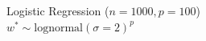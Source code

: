 \documentclass[aspectratio=169,17pt,t]{beamer}
\begin{document}




\begin{frame}
  \begin{center}
    Logistic Regression ($n=1000,p=100$)\\
    $w^* \sim \text{lognormal}(\sigma=2)^p$

  \end{center}
\end{frame}
\end{document}
